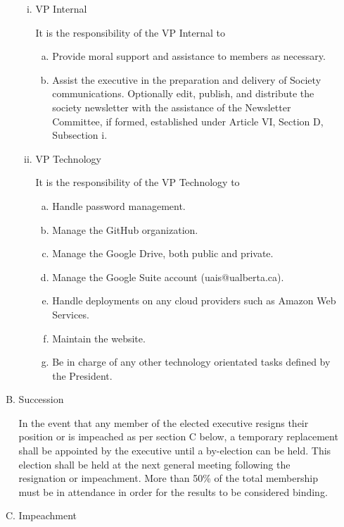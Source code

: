 \documentclass[11pt]{article}
\begin{document}
\begin{enumerate}[I.]
\begin{enumerate}[A)]
\begin{enumerate}[i)]
            \item VP Internal
            
            It is the responsibility of the VP Internal to
            \begin{enumerate}[a)]
            \item Provide moral support and assistance to members as necessary.
            \item Assist the executive in the preparation and delivery of Society communications.
              Optionally edit, publish, and distribute the society
                newsletter with the assistance of the Newsletter Committee, if
                formed, established under Article VI, Section D, Subsection i.
            \end{enumerate}
            
            \item VP Technology
            
            It is the responsibility of the VP Technology to
            \begin{enumerate}[a)]
            \item Handle password management.
            \item Manage the GitHub organization.
            \item Manage the Google Drive, both public and private.
            \item Manage the Google Suite account (uais@ualberta.ca).
            \item Handle deployments on any cloud providers such as Amazon Web Services.
            \item Maintain the website.
            \item Be in charge of any other technology orientated tasks defined by the President.
            \end{enumerate}
        \end{enumerate}
        \item Succession

        In the event that any member of the elected executive resigns their
        position or is impeached as per section C below, a temporary
        replacement shall be appointed by the executive until a by-election
        can be held. This election shall be held at the next general meeting
        following the resignation or impeachment. More than 50\% of the total membership must be in attendance in order for the results to be
        considered binding.
        \item Impeachment


\end{enumerate}
\end{enumerate}
\end{document}
